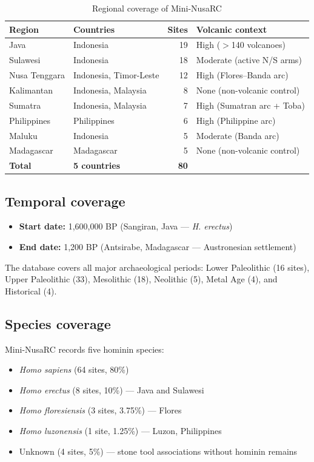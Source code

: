\documentclass[11pt]{article}
\begin{document}
\begin{table}[h]
\centering
\small
\caption{Regional coverage of Mini-NusaRC}
\begin{tabular}{llrl}
\toprule
\textbf{Region} & \textbf{Countries} & \textbf{Sites} & \textbf{Volcanic context} \\
\midrule
Java & Indonesia & 19 & High ({$>$}140 volcanoes) \\
Sulawesi & Indonesia & 18 & Moderate (active N/S arms) \\
Nusa Tenggara & Indonesia, Timor-Leste & 12 & High (Flores--Banda arc) \\
Kalimantan & Indonesia, Malaysia & 8 & None (non-volcanic control) \\
Sumatra & Indonesia, Malaysia & 7 & High (Sumatran arc + Toba) \\
Philippines & Philippines & 6 & High (Philippine arc) \\
Maluku & Indonesia & 5 & Moderate (Banda arc) \\
Madagascar & Madagascar & 5 & None (non-volcanic control) \\
\midrule
\textbf{Total} & \textbf{5 countries} & \textbf{80} & \\
\bottomrule
\end{tabular}
\end{table}

\subsection{Temporal coverage}

\begin{itemize}
    \item \textbf{Start date:} 1,600,000 BP (Sangiran, Java --- \textit{H. erectus})
    \item \textbf{End date:} 1,200 BP (Antsirabe, Madagascar --- Austronesian settlement)
\end{itemize}

The database covers all major archaeological periods: Lower Paleolithic (16 sites), Upper Paleolithic (33), Mesolithic (18), Neolithic (5), Metal Age (4), and Historical (4).

\subsection{Species coverage}

Mini-NusaRC records five hominin species:
\begin{itemize}
    \item \textit{Homo sapiens} (64 sites, 80\%)
    \item \textit{Homo erectus} (8 sites, 10\%) --- Java and Sulawesi
    \item \textit{Homo floresiensis} (3 sites, 3.75\%) --- Flores
    \item \textit{Homo luzonensis} (1 site, 1.25\%) --- Luzon, Philippines \citep{détroit2019luzon}
    \item Unknown (4 sites, 5\%) --- stone tool associations without hominin remains
\end{itemize}
\end{document}
